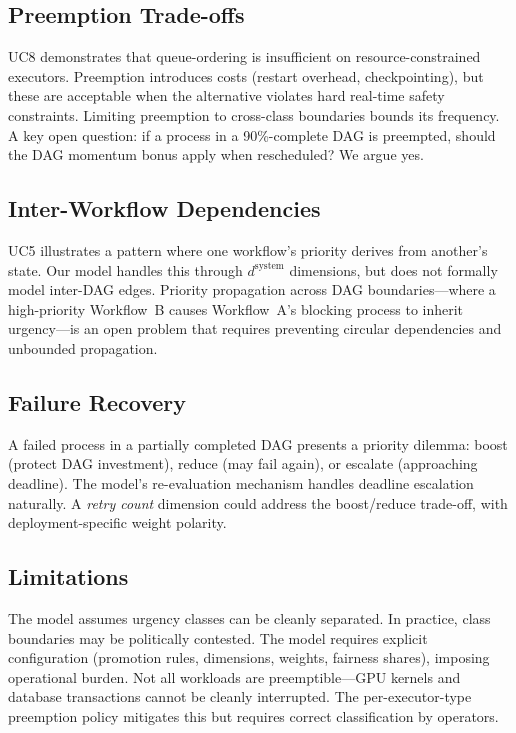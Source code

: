 \documentclass[conference]{IEEEtran}
\begin{document}
\subsection{Preemption Trade-offs}

UC8 demonstrates that queue-ordering is insufficient on resource-constrained executors. Preemption introduces costs (restart overhead, checkpointing), but these are acceptable when the alternative violates hard real-time safety constraints. Limiting preemption to cross-class boundaries bounds its frequency. A key open question: if a process in a 90\%-complete DAG is preempted, should the DAG momentum bonus apply when rescheduled? We argue yes.

\subsection{Inter-Workflow Dependencies}

UC5 illustrates a pattern where one workflow's priority derives from another's state. Our model handles this through $d^{\text{system}}$ dimensions, but does not formally model inter-DAG edges. Priority propagation across DAG boundaries---where a high-priority Workflow~B causes Workflow~A's blocking process to inherit urgency---is an open problem that requires preventing circular dependencies and unbounded propagation.

\subsection{Failure Recovery}

A failed process in a partially completed DAG presents a priority dilemma: boost (protect DAG investment), reduce (may fail again), or escalate (approaching deadline). The model's re-evaluation mechanism handles deadline escalation naturally. A \emph{retry count} dimension could address the boost/reduce trade-off, with deployment-specific weight polarity.

\subsection{Limitations}

The model assumes urgency classes can be cleanly separated. In practice, class boundaries may be politically contested. The model requires explicit configuration (promotion rules, dimensions, weights, fairness shares), imposing operational burden. Not all workloads are preemptible---GPU kernels and database transactions cannot be cleanly interrupted. The per-executor-type preemption policy mitigates this but requires correct classification by operators.
\end{document}
